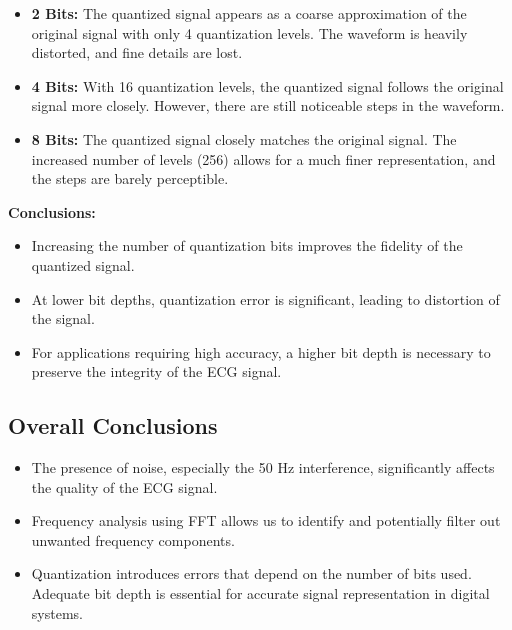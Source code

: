 \documentclass[10pt]{article}
\theoremstyle{definition}
\theoremstyle{remark}
\theoremstyle{definition}
\numberwithin{equation}{prob}
\begin{document}
\begin{itemize}
	\item \textbf{2 Bits:} The quantized signal appears as a coarse approximation of the original signal with only 4 quantization levels. The waveform is heavily distorted, and fine details are lost.
	\item \textbf{4 Bits:} With 16 quantization levels, the quantized signal follows the original signal more closely. However, there are still noticeable steps in the waveform.
	\item \textbf{8 Bits:} The quantized signal closely matches the original signal. The increased number of levels (256) allows for a much finer representation, and the steps are barely perceptible.
\end{itemize}

\textbf{Conclusions:}

\begin{itemize}
	\item Increasing the number of quantization bits improves the fidelity of the quantized signal.
	\item At lower bit depths, quantization error is significant, leading to distortion of the signal.
	\item For applications requiring high accuracy, a higher bit depth is necessary to preserve the integrity of the ECG signal.
\end{itemize}

\subsection{Overall Conclusions}

\begin{itemize}
	\item The presence of noise, especially the 50 Hz interference, significantly affects the quality of the ECG signal.
	\item Frequency analysis using FFT allows us to identify and potentially filter out unwanted frequency components.
	\item Quantization introduces errors that depend on the number of bits used. Adequate bit depth is essential for accurate signal representation in digital systems.
\end{itemize}
\end{document}
